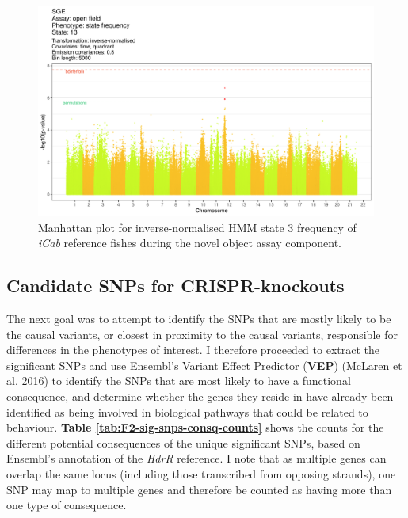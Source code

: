 \documentclass[
]{book}
\begin{document}
\begin{figure}
\includegraphics[width=1\linewidth]{figs/mikk_behaviour/manhattans/sge_of_13_time-quadrant} \caption{Manhattan plot for inverse-normalised HMM state 3 frequency of \emph{\textcolor{iCab_424B4D}{iCab}} reference fishes during the novel object assay component.}\label{fig:F2-man-sge-of-13}
\end{figure}

\hypertarget{candidate-snps-for-crispr-knockouts}{%
\subsection{Candidate SNPs for CRISPR-knockouts}\label{candidate-snps-for-crispr-knockouts}}

The next goal was to attempt to identify the SNPs that are mostly likely to be the causal variants, or closest in proximity to the causal variants, responsible for differences in the phenotypes of interest. I therefore proceeded to extract the significant SNPs and use Ensembl's Variant Effect Predictor (\textbf{VEP}) (McLaren et al. 2016) to identify the SNPs that are most likely to have a functional consequence, and determine whether the genes they reside in have already been identified as being involved in biological pathways that could be related to behaviour. \textbf{Table \ref{tab:F2-sig-snps-consq-counts}} shows the counts for the different potential consequences of the unique significant SNPs, based on Ensembl's annotation of the \emph{HdrR} reference. I note that as multiple genes can overlap the same locus (including those transcribed from opposing strands), one SNP may map to multiple genes and therefore be counted as having more than one type of consequence.
\end{document}
